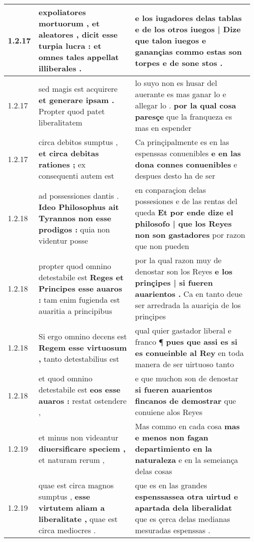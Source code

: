 \begin{tabular}{|p{1cm}|p{6.5cm}|p{6.5cm}|}
1.2.17 & expoliatores mortuorum , et aleatores , \textbf{ dicit esse turpia lucra : } et omnes tales appellat illiberales . & e los iugadores delas tablas \textbf{ e de los otros iuegos | Dize } que talon iuegos e ganançias commo estas son torpes e de sone stos . \\\hline
1.2.17 & sed magis est acquirere \textbf{ et generare ipsam . } Propter quod patet liberalitatem & lo suyo non es husar del auerante es mas ganar lo e allegar lo . \textbf{ por la qual cosa paresçe } que la franqueza es mas en espender \\\hline
1.2.17 & circa debitos sumptus , \textbf{ et circa debitas rationes ; } ex consequenti autem est & Ca prinçipalmente es en las espenssas conuenibles \textbf{ e en las dona connes conuenibles } e despues desto ha de ser \\\hline
1.2.18 & ad possessiones dantis . \textbf{ Ideo Philosophus ait Tyrannos non esse prodigos : } quia non videntur posse & en conparaçion delas possesiones e de las rentas del queda \textbf{ Et por ende dize el philosofo | que los Reyes non son gastadores } por razon que non pueden \\\hline
1.2.18 & propter quod omnino detestabile est \textbf{ Reges et Principes esse auaros : } tam enim fugienda est auaritia a principibus & por la qual razon muy de denostar son los Reyes \textbf{ e los prinçipes | si fueren auarientos . } Ca en tanto deue ser arredrada la auariçia de los prinçipes \\\hline
1.2.18 & Si ergo omnino decens est \textbf{ Regem esse virtuosum , } tanto detestabilius est & qual quier gastador liberal e franco ¶ \textbf{ pues que assi es si es conueinble al Rey } en toda manera de ser uirtuoso tanto \\\hline
1.2.18 & et quod omnino detestabile est \textbf{ eos esse auaros : } restat ostendere , & e que muchon son de denostar \textbf{ si fueren auarientos fincanos de demostrar } que conuiene alos Reyes \\\hline
1.2.19 & et minus non videantur \textbf{ diuersificare speciem , } et naturam rerum , & Mas commo en cada cosa \textbf{ mas e menos non fagan departimiento en la naturaleza } e en la semeiança delas cosas \\\hline
1.2.19 & quae est circa magnos sumptus , \textbf{ esse virtutem aliam a liberalitate , } quae est circa mediocres . & que es en las grandes \textbf{ espenssassea otra uirtud e apartada dela liberalidat } que es çerca delas medianas mesuradas espenssas . \\\hline

\end{tabular}
